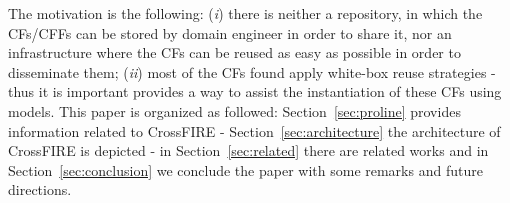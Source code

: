 The motivation is the following: (\textit{i}) there is neither a repository, in which the CFs/CFFs can be stored by domain engineer in order to share it, nor an infrastructure where the CFs can be reused as easy as possible in order to disseminate them; (\textit{ii}) most of the CFs found apply white-box reuse strategies - thus it is important provides a way to assist the instantiation of these CFs using models. This paper is organized as followed: Section~\ref{sec:proline} provides information related to CrossFIRE - Section~\ref{sec:architecture} the architecture of CrossFIRE is depicted - in Section~\ref{sec:related} there are related works and in Section~\ref{sec:conclusion} we conclude the paper with some remarks and future directions.



